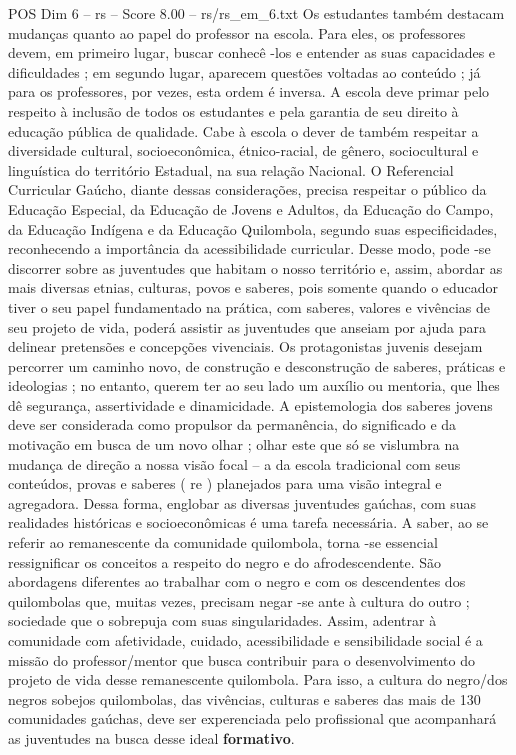 \begin{textsample}{POS Dim 6 – rs – Score 8.00 – rs/rs\_em\_6.txt}
Os estudantes também destacam mudanças quanto ao papel do professor na escola.
Para eles, os professores devem, em primeiro lugar, buscar conhecê -los e entender as suas capacidades e dificuldades ; em segundo lugar, aparecem questões voltadas ao conteúdo ; já para os professores, por vezes, esta ordem é inversa.
A escola deve primar pelo respeito à inclusão de todos os estudantes e pela garantia de seu direito à educação pública de qualidade.
Cabe à escola o dever de também respeitar a diversidade cultural, socioeconômica, étnico-racial, de gênero, sociocultural e linguística do território Estadual, na sua relação Nacional.
O Referencial Curricular Gaúcho, diante dessas considerações, precisa respeitar o público da Educação Especial, da Educação de Jovens e Adultos, da Educação do Campo, da Educação Indígena e da Educação Quilombola, segundo suas especificidades, reconhecendo a importância da acessibilidade curricular.
Desse modo, pode -se discorrer sobre as juventudes que habitam o nosso território e, assim, abordar as mais diversas etnias, culturas, povos e saberes, pois somente quando o educador tiver o seu papel fundamentado na prática, com saberes, valores e vivências de seu projeto de vida, poderá assistir as juventudes que anseiam por ajuda para delinear pretensões e concepções vivenciais.
Os protagonistas juvenis desejam percorrer um caminho novo, de construção e desconstrução de saberes, práticas e ideologias ; no entanto, querem ter ao seu lado um auxílio ou mentoria, que lhes dê segurança, assertividade e dinamicidade.
A epistemologia dos saberes jovens deve ser considerada como propulsor da permanência, do significado e da motivação em busca de um novo olhar ; olhar este que só se vislumbra na mudança de direção a nossa visão focal – a da escola tradicional com seus conteúdos, provas e saberes ( re ) planejados para uma visão integral e agregadora.
Dessa forma, englobar as diversas juventudes gaúchas, com suas realidades históricas e socioeconômicas é uma tarefa necessária.
A saber, ao se referir ao remanescente da comunidade quilombola, torna -se essencial ressignificar os conceitos a respeito do negro e do afrodescendente.
São abordagens diferentes ao trabalhar com o negro e com os descendentes dos quilombolas que, muitas vezes, precisam negar -se ante à cultura do outro ; sociedade que o sobrepuja com suas singularidades.
Assim, adentrar à comunidade com afetividade, cuidado, acessibilidade e sensibilidade social é a missão do professor/mentor que busca contribuir para o desenvolvimento do projeto de vida desse remanescente quilombola.
Para isso, a cultura do negro/dos negros sobejos quilombolas, das vivências, culturas e saberes das mais de 130 comunidades gaúchas, deve ser experenciada pelo profissional que acompanhará as juventudes na busca desse ideal \textbf{formativo}.

\end{textsample}
